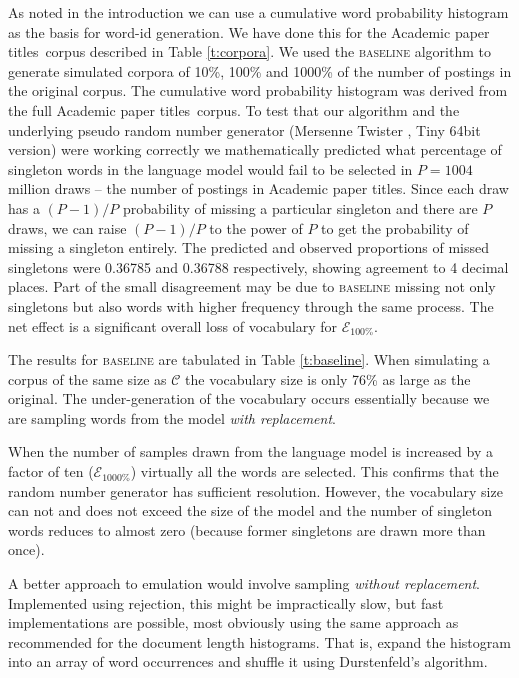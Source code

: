 \documentclass[11pt]{report}
\newcommand{\script}[1]{$\mathcal{#1}$}
\newcommand{\AcademicID}{Academic paper titles}
\begin{document}
As noted in the introduction we can use a cumulative word probability
histogram as the basis for word-id generation.  We have
done this for the \AcademicID~corpus described in Table
\ref{t:corpora}.  We used the \textsc{baseline} algorithm to generate
simulated corpora of 10\%, 100\% and 1000\% of the number of
postings in the original corpus.  The cumulative word probability
histogram was derived from the full \AcademicID~corpus.
To test that our algorithm and the underlying pseudo random number
generator (Mersenne Twister \cite{MatsumotoN1998}, Tiny 64bit version) were working
correctly
we mathematically predicted what percentage of singleton words in the
language model would fail to be selected in $P=1004$ million draws --
the number of postings in Academic paper titles. Since each draw has a
$(P-1)/P$ probability of missing a particular singleton and there are
$P$ draws, we can raise $(P-1)/P$ to the power of $P$ to get the
probability of missing a singleton entirely.  The predicted and
observed proportions of missed singletons were 0.36785 and 0.36788
respectively, showing agreement to 4 decimal places.  Part of the
small disagreement may be due to 
\textsc{baseline} missing not only singletons but also words with
higher frequency through the same process.  The net effect is a significant
overall loss of vocabulary for \script{E}$_{100\%}$.

The results for \textsc{baseline} are tabulated in Table
\ref{t:baseline}.  When simulating a corpus of the same size as
\script{C} the vocabulary size is only 76\% as large as the original.
The under-generation of the vocabulary occurs
essentially because we are sampling words from the model \textit{with replacement}.

When the number of samples drawn from the language model is increased
by a factor of ten (\script{E}$_{1000\%}$) virtually all the words are
selected.  This confirms that the random number generator has
sufficient resolution.  However, the vocabulary size can not and does
not exceed the size of the model and the number of singleton words
reduces to almost zero (because former singletons are drawn more than
once).

A better approach to emulation would involve sampling \textit{without
  replacement}.  Implemented using rejection, this might be
impractically slow, but fast implementations are possible, most
obviously using the same approach as recommended for the document
length histograms.  That is, expand the histogram into an array of
word occurrences and shuffle it using Durstenfeld's algorithm.
\end{document}
